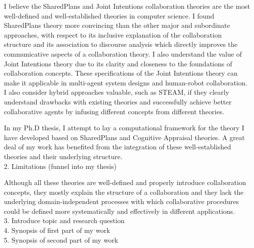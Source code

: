 \documentclass[a4paper, 10pt]{article}
\begin{document}
\begin{small}

I believe the SharedPlans and Joint Intentions collaboration theories are the
most well-defined and well-established theories in computer science. I found
SharedPlans theory more convincing than the other major and subordinate
approaches, with respect to its inclusive explanation of the collaboration
structure and its association to discourse analysis which directly improves the
communicative aspects of a collaboration theory. I also understand the value of
Joint Intentions theory due to its clarity and closeness to the foundations of
collaboration concepts. These specifications of the Joint Intentions theory can
make it applicable in multi-agent system designs and human-robot collaboration.
I also consider hybrid approaches valuable, such as STEAM, if they clearly
understand drawbacks with existing theories and successfully achieve better
collaborative agents by infusing different concepts from different theories.

In my Ph.D thesis, I attempt to lay a computational framework for the theory I
have developed based on SharedPlans and Cognitive Appraisal theories. A great
deal of my work has benefited from the integration of these well-established
theories and their underlying structure.\\

2. Limitations (funnel into my thesis)

Although all these theories are well-defined and properly introduce
collaboration concepts, they mostly explain the structure of a collaboration and
they lack the underlying domain-independent processes with which collaborative
procedures could be defined more systematically and effectively in different
applications.\\

3. Introduce topic and research question \\

4. Synopsis of first part of my work \\

5. Synopsis of second part of my work \\


\end{small}
\end{document}
